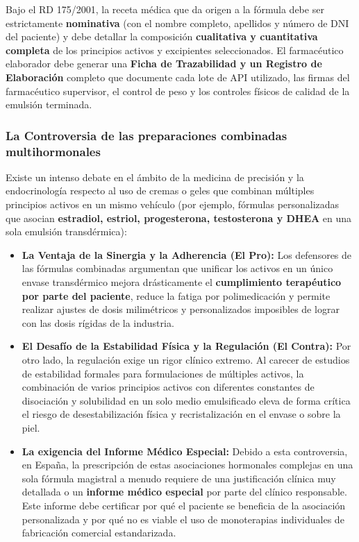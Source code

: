 \documentclass[
  spanish,
]{article}
\begin{document}
Bajo el RD 175/2001, la receta médica que da origen a la fórmula debe ser estrictamente \textbf{nominativa} (con el nombre completo, apellidos y número de DNI del paciente) y debe detallar la composición \textbf{cualitativa y cuantitativa completa} de los principios activos y excipientes seleccionados. El farmacéutico elaborador debe generar una \textbf{Ficha de Trazabilidad y un Registro de Elaboración} completo que documente cada lote de API utilizado, las firmas del farmacéutico supervisor, el control de peso y los controles físicos de calidad de la emulsión terminada.

\subsubsection{La Controversia de las preparaciones combinadas multihormonales}\label{la-controversia-de-las-preparaciones-combinadas-multihormonales}

Existe un intenso debate en el ámbito de la medicina de precisión y la endocrinología respecto al uso de cremas o geles que combinan múltiples principios activos en un mismo vehículo (por ejemplo, fórmulas personalizadas que asocian \textbf{estradiol, estriol, progesterona, testosterona y DHEA} en una sola emulsión transdérmica):

\begin{itemize}
\item
  \textbf{La Ventaja de la Sinergia y la Adherencia (El Pro):} Los defensores de las fórmulas combinadas argumentan que unificar los activos en un único envase transdérmico mejora drásticamente el \textbf{cumplimiento terapéutico por parte del paciente}, reduce la fatiga por polimedicación y permite realizar ajustes de dosis milimétricos y personalizados imposibles de lograr con las dosis rígidas de la industria.
\item
  \textbf{El Desafío de la Estabilidad Física y la Regulación (El Contra):} Por otro lado, la regulación exige un rigor clínico extremo. Al carecer de estudios de estabilidad formales para formulaciones de múltiples activos, la combinación de varios principios activos con diferentes constantes de disociación y solubilidad en un solo medio emulsificado eleva de forma crítica el riesgo de desestabilización física y recristalización en el envase o sobre la piel.
\item
  \textbf{La exigencia del Informe Médico Especial:} Debido a esta controversia, en España, la prescripción de estas asociaciones hormonales complejas en una sola fórmula magistral a menudo requiere de una justificación clínica muy detallada o un \textbf{informe médico especial} por parte del clínico responsable. Este informe debe certificar por qué el paciente se beneficia de la asociación personalizada y por qué no es viable el uso de monoterapias individuales de fabricación comercial estandarizada.
\end{itemize}
\end{document}
